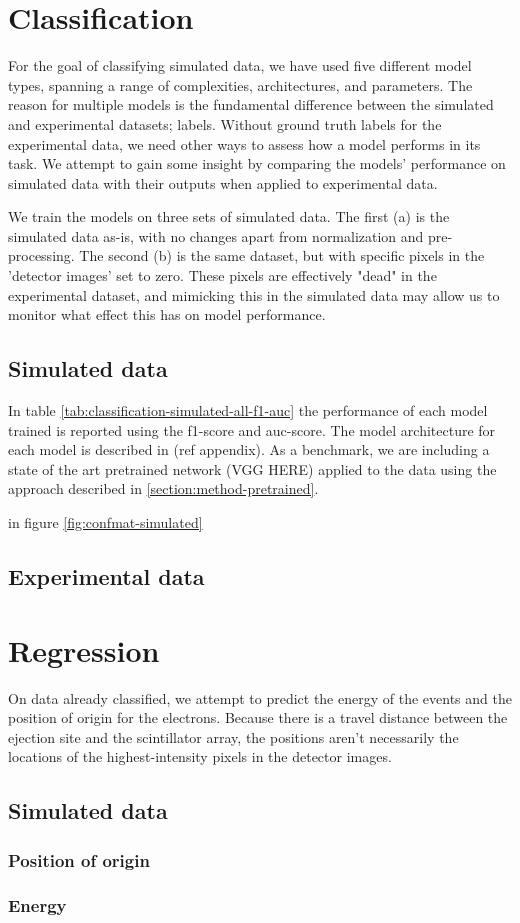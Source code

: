 \section{Classification}
For the goal of classifying simulated data, we have used five different model types,
spanning a range of complexities, architectures, and parameters.
The reason for multiple models is the fundamental difference between the
simulated and experimental datasets; labels. Without ground truth labels
for the experimental data, we need other ways to assess how a model performs in
its task. We attempt to gain some insight by comparing the models' performance on
simulated data with their outputs when applied to experimental data.

We train the models on three sets of simulated data.
The first (a) is the simulated data as-is, with no changes apart from normalization
and pre-processing. The second (b) is the same dataset, but with specific pixels in
the 'detector images' set to zero. These pixels are effectively "dead" in the
experimental dataset, and mimicking this in the simulated data may allow us to monitor
what effect this has on model performance.

\subsection{Simulated data}
In table \ref{tab:classification-simulated-all-f1-auc} the performance of each model 
trained is reported using the f1-score and auc-score. The model architecture for each 
model is described in (ref appendix).
As a benchmark, we are including a state of the art pretrained 
network (\cite{}VGG HERE) applied to the data using the approach described 
in \ref{section:method-pretrained}.

in figure \ref{fig:confmat-simulated}

\subsection{Experimental data}

\section{Regression}
On data already classified, we attempt to predict the energy of the events and the position of origin for
the electrons. Because there is a travel distance between the ejection site and the scintillator array,
the positions aren't necessarily the locations of the highest-intensity pixels in the detector images.
\subsection{Simulated data}
\subsubsection{Position of origin}

\subsubsection{Energy}

